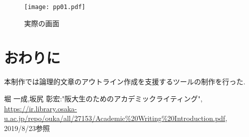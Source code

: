 \documentclass[twocolumn,10pt,a4j]{jsarticle}
\begin{document}
\begin{comment}
実装した機能として\textcircled{\scriptsize{1}}は「主張と根拠の対応」,\textcircled{\scriptsize{2}}は「課題に対する疑問とその答えの記入」,\textcircled{\scriptsize{3}}は「論理的な構成の整理」,\textcircled{\scriptsize{4}}「参考文献の管理」とする．
\textcircled{\scriptsize{1}}「主張と根拠」ではまず主張の表示をした.
また根拠は複数存在する可能性があるため根拠の追加も行えるようにした.
\textcircled{\scriptsize{2}}「問いと答え」では課題や主張への疑問とそれに対する答えを短い文章で記述し，見返した際に主張からずれた意見が出ることを防ぐことができると考え，課題や主張への疑問と答えを短い文章で記述する．
\textcircled{\scriptsize{3}}「論理的な構成」では論理的な文章を書く上で各内容の順番や序論，本論，結論のどの部分の情報なのかを整理するため順番を入れ替える機能，文章がどの章に情報なのか表示する機能にした．
\textcircled{\scriptsize{4}}「参考文献」では文章を作成する際の引用した文献を整理することが目的であり,どの文献が何章で参照を行ったのか確認できるように参考文献にはラベルを付けた.
\end{comment}

\begin{figure}[h]
\begin{center}
 \texttt{[image: pp01.pdf]}
\end{center}
 \caption{実際の画面}
 \label{fig:g}
\end{figure}

\section{おわりに}
本制作では論理的文章のアウトライン作成を支援するツールの制作を行った.

\begin{thebibliography}{99}
 堀 一成,坂尻 彰宏:"阪大生のためのアカデミックライティング",
\url{https://ir.library.osaka-u.ac.jp/repo/ouka/all/27153/Academic%20Writing%20Introduction.pdf}, 2019/8/23参照


\end{thebibliography}
\end{document}

